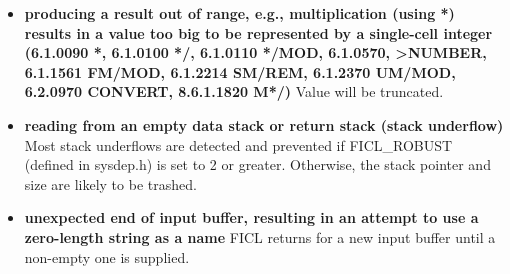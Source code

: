 \begin{itemize}[noitemsep]
	\item \textbf{producing a result out of range, e.g.,
		multiplication (using *) results in a value too big to
		be represented by a single-cell integer (6.1.0090 *,
		6.1.0100 */, 6.1.0110 */MOD, 6.1.0570, >NUMBER, 6.1.1561
		FM/MOD, 6.1.2214 SM/REM, 6.1.2370 UM/MOD, 6.2.0970
		CONVERT, 8.6.1.1820 M*/)}\newline
	Value will be truncated.

	\item \textbf{reading from an empty data stack or return stack
		(stack underflow)}\newline
	Most stack underflows are detected and prevented if FICL\_ROBUST
	(defined in sysdep.h) is set to 2 or greater. Otherwise, the
	stack pointer and size are likely to be trashed.

	\item \textbf{unexpected end of input buffer, resulting in an
		attempt to use a zero-length string as a name}\newline
	FICL returns for a new input buffer until a non-empty one is
	supplied.
\end{itemize}

